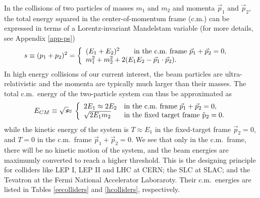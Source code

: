 \documentclass[prd,aps,floats,preprintnumbers,preprint,superscriptaddress,floatfix,nofootinbib]{revtex4}
\def\vp{{\vec p}}
\def\ecm{E_{CM}}
\def\bea{\begin{eqnarray}}
\def\eea{\end{eqnarray}}
\begin{document}
In the collisions of two particles of masses $m_1$ and $m_2$
and momenta $\vp_1$ and $\vp_2$, the total energy squared in the
center-of-momentum frame (c.m.)  can be expressed in terms of a  
Lorentz-invariant Mandelstam variable (for more details, see
Appendix \ref{app-ps})
%
\bea
\nonumber
s  \equiv  (p_1+p_2)^2 = \left\{  
\begin{array}{ll}
(E_1 + E_2 )^2 \qquad   {\rm  in\  the\  c.m.\ frame}\ \vp_1+\vp_2=0, & \\
  m_1^2 + m_2^2 + 2(E_1E_2-\vp_1\cdot \vp_2). &  
\end{array}
\right.
\eea
%
In high energy collisions of our current interest, the beam particles are ultra-relativistic
and the momenta are typically much larger than their masses.
The total c.m.~energy of the two-particle system can thus be approximated as 
\bea
\nonumber
\ecm \equiv \sqrt s \hskip-0.2cm & \approx &\hskip-0.2cm  
\left\{  
\begin{array}{ll}
2E_1 \approx 2 E_2   &   {\rm  in\ the\ c.m.\ frame}\ \vp_1+\vp_2=0, \\
\sqrt{2 E_1 m_2} &   {\rm in\ the\ fixed\ target\  frame\ \vp_2=0}. 
\end{array}
\right.
\eea
while the kinetic energy of the system is
$T \approx  E_1$ in  the  fixed-target  frame $\vp_2=0$, 
and $T = 0$  in the  c.m.~frame $\vp_1+\vp_2=0.$
%
We see that only in the c.m.~frame, there will be no kinetic motion of
the system, and  the beam energies are maximumly 
converted to reach a higher threshold. This is the designing 
principle for colliders like LEP I,  LEP II and LHC at CERN; the SLC at 
SLAC; and the Tevatron at the Fermi National Accelerator Laboraroty. 
Their c.m.~energies are listed in Tables \ref{eecolliders} 
and \ref{hcolliders}, respectively. 
\end{document}

